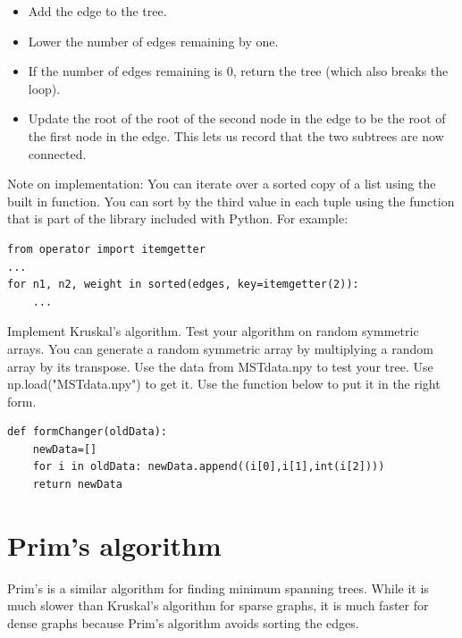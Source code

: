 \begin{itemize}
\begin{itemize}
		\begin{itemize}

		\item Add the edge to the tree.

		\item Lower the number of edges remaining by one.

		\item If the number of edges remaining is 0, return the tree (which also breaks the loop).

		\item Update the root of the root of the second node in the edge to be the root of the first node in the edge.
			This lets us record that the two subtrees are now connected.

		\end{itemize}

	\end{itemize}

\end{itemize}
Note on implementation: You can iterate over a sorted copy of a list using the built in  function.
You can sort by the third value in each tuple using the  function that is part of the  library included with Python.
For example:
\begin{lstlisting}
from operator import itemgetter
...
for n1, n2, weight in sorted(edges, key=itemgetter(2)):
    ...
\end{lstlisting}

\begin{problem}
Implement Kruskal's algorithm.
Test your algorithm on random symmetric arrays.
You can generate a random symmetric array by multiplying a random array by its transpose.
Use the data from MSTdata.npy to test your tree.
Use np.load("MSTdata.npy") to get it.
Use the  function below to put it in the right form.
\begin{lstlisting}
def formChanger(oldData):
    newData=[]
    for i in oldData: newData.append((i[0],i[1],int(i[2])))
    return newData
\end{lstlisting}
\end{problem}
\section*{Prim's algorithm}

Prim's is a similar algorithm for finding minimum spanning trees.
While it is much slower than Kruskal's algorithm for sparse graphs, it is much faster for dense graphs because Prim's algorithm avoids sorting the edges.

